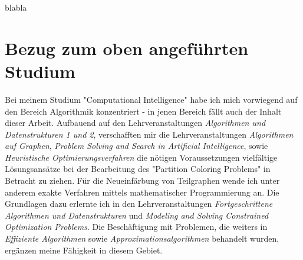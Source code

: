 blabla

\section{Bezug zum oben angeführten Studium}

Bei meinem Studium "Computational Intelligence" habe ich mich vorwiegend auf den Bereich Algorithmik konzentriert - in jenen Bereich f\"allt auch der Inhalt dieser Arbeit. Aufbauend auf den Lehrveranstaltungen \textit{Algorithmen und Datenstrukturen 1 und 2}, verschafften mir die Lehrveranstaltungen \textit{Algorithmen auf Graphen}, \textit{Problem Solving and Search in Artificial Intelligence}, sowie \textit{Heuristische Optimierungsverfahren} die n\"otigen Voraussetzungen vielf\"altige L\"osungsans\"atze bei der Bearbeitung des "Partition Coloring Problems" in Betracht zu ziehen. F\"ur die Neueinf\"arbung von Teilgraphen wende ich unter anderem exakte Verfahren mittels mathematischer Programmierung an. Die Grundlagen dazu erlernte ich in den Lehrveranstaltungen \textit{Fortgeschrittene Algorithmen und Datenstrukturen} und \textit{Modeling and Solving Constrained Optimization Problems}. Die Besch\"aftigung mit Problemen, die weiters in \textit{Effiziente Algorithmen} sowie \textit{Approximationsalgorithmen} behandelt wurden, erg\"anzen meine F\"ahigkeit in diesem Gebiet.

			     			      

